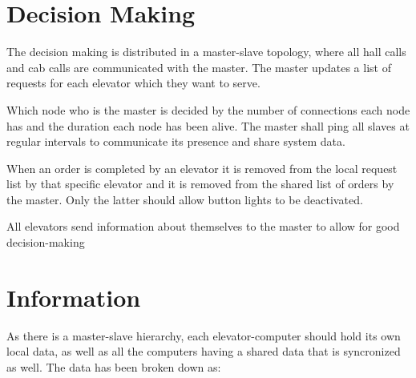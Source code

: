 \section{Decision Making}
\label{sec:decisionmaking}

The decision making is distributed in a master-slave topology, where all hall calls and cab calls are communicated with the master. The master updates a list of requests for each elevator which they want to serve. 

Which node who is the master is decided by the number of connections each node has and the duration each node has been alive. The master shall ping all slaves at regular intervals to communicate its presence and share system data. 

When an order is completed by an elevator it is removed from the local request list by that specific elevator and it is removed from the shared list of orders by the master. Only the latter should allow button lights to be deactivated.

All elevators send information about themselves to the master to allow for good decision-making

\section{Information}
\label{sec: information}
As there is a master-slave hierarchy, each elevator-computer should hold its own local data, as well as all the computers having a shared data that is syncronized as well. The data has been broken down as:

